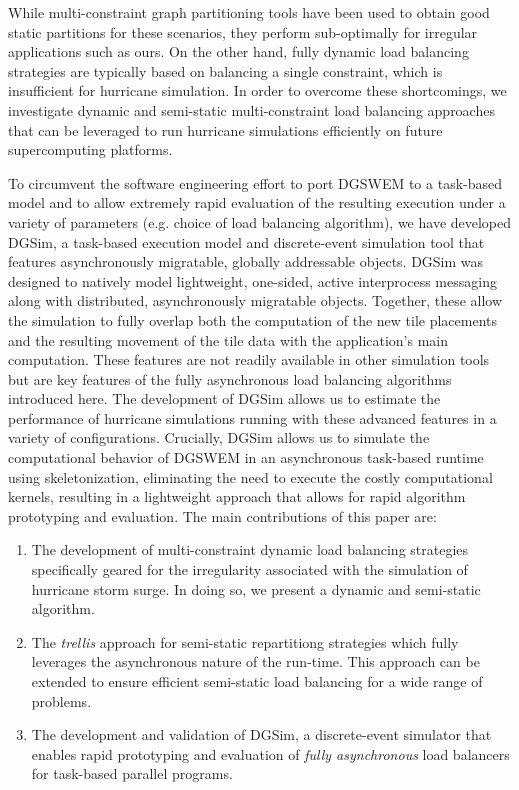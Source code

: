 While multi-constraint graph partitioning tools have been used to obtain good static partitions for these scenarios, they perform sub-optimally for irregular applications such as ours.
On the other hand, fully dynamic load balancing strategies are typically based on balancing a single constraint, which is insufficient for hurricane simulation.
In order to overcome these shortcomings, we investigate dynamic and semi-static multi-constraint load balancing approaches that can be leveraged to run hurricane simulations efficiently on future supercomputing platforms.

To circumvent the software engineering effort to port DGSWEM to a task-based model and to allow extremely rapid evaluation of the resulting execution under a variety of parameters (e.g. choice of load balancing algorithm), we have developed DGSim, a task-based execution model and discrete-event simulation tool that features asynchronously migratable, globally addressable objects.
DGSim was designed to natively model lightweight, one-sided, active interprocess messaging along with distributed, asynchronously migratable objects.  Together, these allow the simulation to fully overlap both the computation of the new tile placements and the resulting movement of the tile data with the application's main computation.  These features are not readily available in other simulation tools but are key features of the fully asynchronous load balancing algorithms introduced here.
The development of DGSim allows us to estimate the performance of hurricane simulations running with these advanced features in a variety of configurations.
Crucially, DGSim allows us to simulate the computational behavior of DGSWEM in an asynchronous task-based runtime using skeletonization, eliminating the need to execute the costly computational kernels, resulting in a lightweight approach that allows for rapid algorithm prototyping and evaluation.
The main contributions of this paper are:
\begin{enumerate}
\item The development of multi-constraint dynamic load balancing strategies specifically geared for the irregularity associated with the simulation of hurricane storm surge. In doing so, we present a dynamic and semi-static algorithm.
\item The \emph{trellis} approach for semi-static repartitiong strategies which fully leverages the asynchronous nature of the run-time. This approach can be extended to ensure efficient semi-static load balancing for a wide range of problems.
\item The development and validation of DGSim, a discrete-event simulator that enables rapid prototyping and evaluation of {\em fully asynchronous} load balancers for task-based parallel programs.
\end{enumerate}

